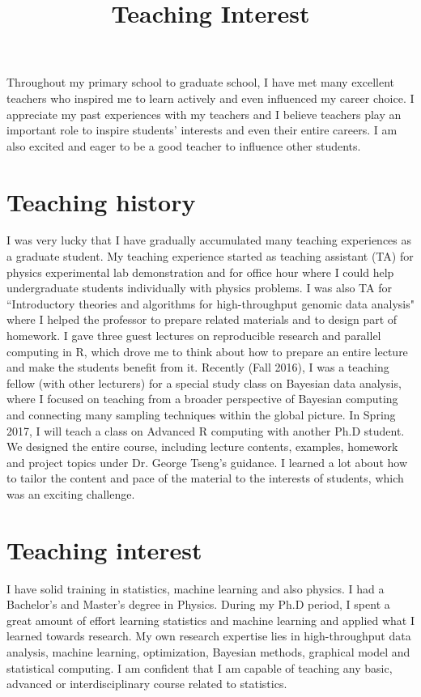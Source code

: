\documentclass[12pt]{amsart} \usepackage{amssymb}
\title[]{Teaching Interest}
\begin{document}
\maketitle
\thispagestyle{empty}

Throughout my primary school to graduate school,
I have met many excellent teachers who inspired me to learn actively and even influenced my career choice. 
I appreciate my past experiences with my teachers 
and I believe teachers play an important role to inspire students' interests and even their entire careers.
I am also excited and eager to be a good teacher to influence other students.

\section{Teaching history}

I was very lucky that I have gradually accumulated many teaching experiences as a graduate student.
My teaching experience started as teaching assistant (TA) for physics experimental lab demonstration 
and for office hour where I could help undergraduate students individually with physics problems.
I was also TA for ``Introductory theories and algorithms for high-throughput genomic data analysis"
where I helped the professor to prepare related materials and to design part of homework.
I gave three guest lectures on reproducible research and parallel computing in R,
which drove me to think about how to prepare an entire lecture and make the students benefit from it.
Recently (Fall 2016), 
I was a teaching fellow (with other lecturers) for a special study class on Bayesian data analysis,
where I focused on teaching from a broader perspective of Bayesian computing and connecting many sampling techniques within the global picture.
In Spring 2017, I will teach a class on Advanced R computing with another Ph.D student.
We designed the entire course, including lecture contents, examples, homework and project topics
under Dr. George Tseng's guidance. 
I learned a lot about how to tailor the content and pace of the material to the interests of students, 
which was an exciting challenge.
\section{Teaching interest}
I have solid training in statistics, machine learning and also physics.
I had a Bachelor's and Master's degree in Physics.
During my Ph.D period,
I spent a great amount of effort learning statistics and machine learning and applied what I learned towards research.
My own research expertise lies in high-throughput data analysis, machine learning, optimization, Bayesian methods, graphical model and statistical computing.
I am confident that I am capable of teaching any basic, advanced or interdisciplinary course related to statistics.
\end{document}

